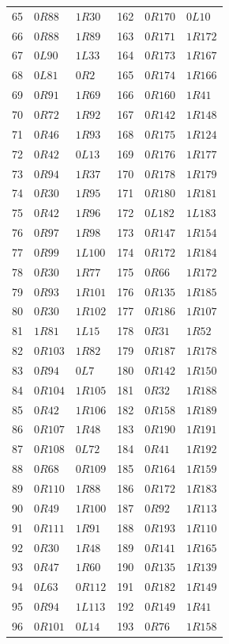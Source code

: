 \begin{longtable}{rll@{\hspace{1.6cm}}rll}
65&$0R88$&$1R30$&162&$0R170$&$0L10$\\
66&$0R88$&$1R89$&163&$0R171$&$1R172$\\
67&$0L90$&$1L33$&164&$0R173$&$1R167$\\
68&$0L81$&$0R2$&165&$0R174$&$1R166$\\
69&$0R91$&$1R69$&166&$0R160$&$1R41$\\
70&$0R72$&$1R92$&167&$0R142$&$1R148$\\
71&$0R46$&$1R93$&168&$0R175$&$1R124$\\
72&$0R42$&$0L13$&169&$0R176$&$1R177$\\
73&$0R94$&$1R37$&170&$0R178$&$1R179$\\
74&$0R30$&$1R95$&171&$0R180$&$1R181$\\
75&$0R42$&$1R96$&172&$0L182$&$1L183$\\
76&$0R97$&$1R98$&173&$0R147$&$1R154$\\
77&$0R99$&$1L100$&174&$0R172$&$1R184$\\
78&$0R30$&$1R77$&175&$0R66$&$1R172$\\
79&$0R93$&$1R101$&176&$0R135$&$1R185$\\
80&$0R30$&$1R102$&177&$0R186$&$1R107$\\
81&$1R81$&$1L15$&178&$0R31$&$1R52$\\
82&$0R103$&$1R82$&179&$0R187$&$1R178$\\
83&$0R94$&$0L7$&180&$0R142$&$1R150$\\
84&$0R104$&$1R105$&181&$0R32$&$1R188$\\
85&$0R42$&$1R106$&182&$0R158$&$1R189$\\
86&$0R107$&$1R48$&183&$0R190$&$1R191$\\
87&$0R108$&$0L72$&184&$0R41$&$1R192$\\
88&$0R68$&$0R109$&185&$0R164$&$1R159$\\
89&$0R110$&$1R88$&186&$0R172$&$1R183$\\
90&$0R49$&$1R100$&187&$0R92$&$1R113$\\
91&$0R111$&$1R91$&188&$0R193$&$1R110$\\
92&$0R30$&$1R48$&189&$0R141$&$1R165$\\
93&$0R47$&$1R60$&190&$0R135$&$1R139$\\
94&$0L63$&$0R112$&191&$0R182$&$1R149$\\
95&$0R94$&$1L113$&192&$0R149$&$1R41$\\
96&$0R101$&$0L14$&193&$0R76$&$1R158$\\
\bottomrule
\end{longtable}
